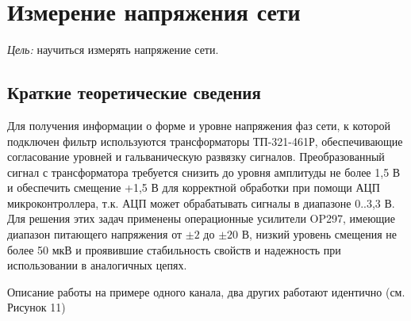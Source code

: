 
\section{Измерение напряжения сети}

{\it Цель:} научиться измерять напряжение сети.
 
\subsection{Краткие теоретические сведения}

Для получения информации о форме и уровне напряжения фаз сети, к которой подключен фильтр используются трансформаторы ТП-321-461Р, 
обеспечивающие согласование уровней и гальваническую развязку сигналов. 
Преобразованный сигнал с трансформатора требуется снизить до уровня амплитуды не более 1,5 В и обеспечить смещение +1,5 В 
для корректной обработки при помощи АЦП микроконтроллера, т.к. АЦП может обрабатывать сигналы в диапазоне 0..3,3 В. 
Для решения этих задач применены операционные усилители OP297, имеющие диапазон питающего напряжения от $\pm2$ до $\pm20$ В, 
низкий уровень смещения не более 50 мкВ и проявившие стабильность свойств и надежность при использовании в аналогичных цепях. 

Описание работы на примере одного канала, два других работают идентично (см. Рисунок 11)

